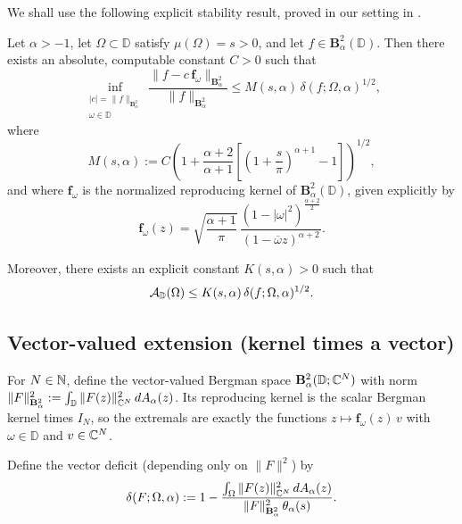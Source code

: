 \documentclass[a4paper,10pt]{amsart}
\newcommand{\D}{\mathbb{D}}
\newcommand{\Berg}{\mathbf{B}_{\alpha}^2}
\begin{document}
\medskip

We shall use the following explicit stability result, proved in our setting in
\cite[Theorem~1.2]{GomezKalajMelentijevicRamos2025}.

\begin{numthm}\label{thm:BergmanStability}
Let \(\alpha>-1\), let \(\Omega\subset\D\) satisfy \(\mu(\Omega)=s>0\), and let
\(f\in \mathbf B_\alpha^2(\mathbb{D})\). Then there exists an absolute, computable constant
\(C>0\) such that
\begin{equation}\label{eqn:BergmanStabilityFunction}
\inf_{\substack{|c|=\|f\|_{\mathbf B_\alpha^2}\\ \omega\in\D}}
\frac{\|f-c\,\mathbf{f}_{\omega}\|_{\mathbf B_\alpha^2}}{\|f\|_{\mathbf B_\alpha^2}}
\le
M(s,\alpha)\,\delta(f;\Omega,\alpha)^{1/2},
\end{equation}
where
\begin{equation}\label{eq:def-Msa}
M(s,\alpha)
:=
C\left(
1+\frac{\alpha+2}{\alpha+1}
\left[
\left(1+\frac{s}{\pi}\right)^{\alpha+1}-1
\right]
\right)^{1/2},
\end{equation}
and where \(\mathbf{f}_{\omega}\) is the normalized reproducing kernel of
\(\mathbf B_\alpha^2(\D)\), given explicitly by
\[
\mathbf{f}_{\omega}(z)
=
\sqrt{\frac{\alpha+1}{\pi}}\,
\frac{(1-|\omega|^2)^{\frac{\alpha+2}{2}}}{(1-\overline{\omega}z)^{\alpha+2}}.
\]

Moreover, there exists an explicit constant \(K(s,\alpha)>0\) such that
\begin{equation}\label{eqn:BergmanStabilitySet}
\mcalA_{\D}(\Omega)
\le
K(s,\alpha)\,\delta(f;\Omega,\alpha)^{1/2}.
\end{equation}
\end{numthm}


\medskip

\subsection*{Vector-valued extension (kernel times a vector)}

For $N\in\mathbb{N}$, define the vector-valued Bergman space
$\mathbf B_\alpha^2(\D;\C^N)$ with norm
$\|F\|_{\Berg}^2:=\int_\D \|F(z)\|_{\C^N}^2\,dA_\alpha(z)$.
Its reproducing kernel is the scalar Bergman kernel times $I_N$,
so the extremals are exactly the functions $z\mapsto \mathbf f_\omega(z)\,v$ with $\omega\in\D$
and $v\in\mathbb{C}^N$.

Define the vector deficit (depending only on $\|F\|^2$) by
\begin{equation}\label{eq:deficit-vector}
\delta(F;\Omega,\alpha)
:=
1-\frac{\int_\Omega \|F(z)\|_{\C^N}^2\,dA_\alpha(z)}{\|F\|_{\Berg}^2\,\theta_\alpha(s)}.
\end{equation}
\end{document}
